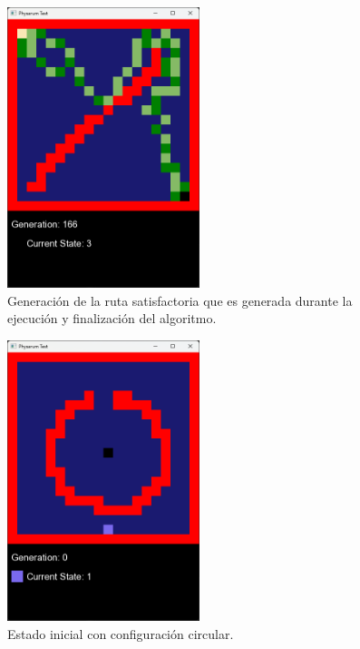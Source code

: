     \begin{figure}[htbp]
        \centering
        \includegraphics[width=0.5\textwidth]{./images/Pruebas/simulador/image069.png}
        \caption{Generaci\'on de la ruta satisfactoria que es generada durante la ejecuci\'on y finalizaci\'on del algoritmo.}
        \label{fig:Ruta 69}
    \end{figure}
    \vskip 0.5cm
    \begin{figure}[htbp]
        \centering
        \includegraphics[width=0.5\textwidth]{./images/Pruebas/simulador/image071.png}
        \caption{Estado inicial con configuraci\'on circular.}
        \label{fig:Ruta 71}
    \end{figure}
